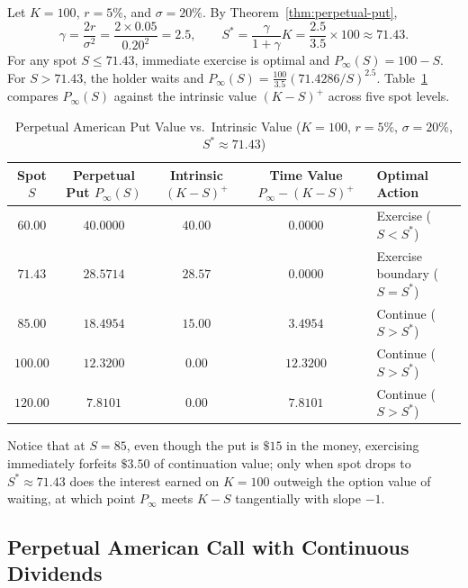 \begin{example}\label{ex:perpetual-put}
    Let $K = 100$, $r = 5\%$, and $\sigma = 20\%$. By Theorem~\ref{thm:perpetual-put},
    \[
    \gamma = \frac{2r}{\sigma^2} = \frac{2 \times 0.05}{0.20^2} = 2.5, \qquad
    S^* = \frac{\gamma}{1 + \gamma} K = \frac{2.5}{3.5} \times 100 \approx 71.43.
    \]
    For any spot $S \le 71.43$, immediate exercise is optimal and $P_\infty(S) = 100 - S$. For $S > 71.43$, the holder waits and $P_\infty(S) = \frac{100}{3.5}(71.4286 / S)^{2.5}$. Table~\ref{tab:perpetual-put-ex} compares $P_\infty(S)$ against the intrinsic value $(K - S)^+$ across five spot levels.

    \begin{table}[!htbp]
        \centering
        \small
        \caption{Perpetual American Put Value vs.\ Intrinsic Value ($K = 100$, $r = 5\%$, $\sigma = 20\%$, $S^* \approx 71.43$)}\label{tab:perpetual-put-ex}
        \begin{tabular}{c c c c l}
            \toprule
            \textbf{Spot $S$} & \textbf{Perpetual Put $P_\infty(S)$} & \textbf{Intrinsic $(K - S)^+$} & \textbf{Time Value $P_\infty - (K - S)^+$} & \textbf{Optimal Action} \\
            \midrule
            $60.00$  & $40.0000$ & $40.00$ & $0.0000$  & Exercise ($S < S^*$) \\
            $71.43$  & $28.5714$ & $28.57$ & $0.0000$  & Exercise boundary ($S = S^*$) \\
            $85.00$  & $18.4954$ & $15.00$ & $3.4954$  & Continue ($S > S^*$) \\
            $100.00$ & $12.3200$ & $0.00$  & $12.3200$ & Continue ($S > S^*$) \\
            $120.00$ & $7.8101$  & $0.00$  & $7.8101$  & Continue ($S > S^*$) \\
            \bottomrule
        \end{tabular}
    \end{table}

    Notice that at $S = 85$, even though the put is $\$15$ in the money, exercising immediately forfeits $\$3.50$ of continuation value; only when spot drops to $S^* \approx 71.43$ does the interest earned on $K = 100$ outweigh the option value of waiting, at which point $P_\infty$ meets $K - S$ tangentially with slope $-1$.
\end{example}

\subsection{Perpetual American Call with Continuous Dividends}

